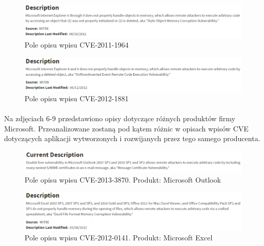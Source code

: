 \documentclass[a4paper,12pt,twoside]{article}
\begin{document}
\begin{figure}[h]
    \centering
    \includegraphics[width=1.0\textwidth]{image/004CVE20111964.png}
    \caption{Pole opisu wpisu CVE-2011-1964}
\end{figure}

\begin{figure}[h]
    \centering
    \includegraphics[width=1.0\textwidth]{image/005CVE20121881.png}
    \caption{Pole opisu wpisu CVE-2012-1881}
\end{figure}

\paragraph{}
Na zdjęciach 6-9 przedstawiono opisy dotyczące różnych produktów firmy Microsoft. Przeanalizowane zostaną pod kątem różnic w opisach wpisów CVE dotyczących aplikacji wytworzonych i rozwijanych przez tego samego producenta. 

\begin{figure}[h]
    \centering
    \includegraphics[width=1.0\textwidth]{image/006CVE20133870.png}
    \caption{Pole opisu wpisu CVE-2013-3870. Produkt: Microsoft Outlook}
\end{figure}

\begin{figure}[h]
    \centering
    \includegraphics[width=1.0\textwidth]{image/007CVE20120141.png}
    \caption{Pole opisu wpisu CVE-2012-0141. Produkt: Microsoft Excel}
\end{figure}
\end{document}
